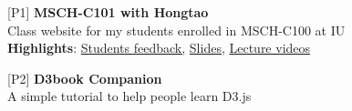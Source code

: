 

\begin{cventries}
\begin{rSection}{}
{\vspace{-0.5em}\hspace{-1.5em}[P1]\hspace{1em}\bodyfont\bfseries\color{darktext} {MSCH-C101 with Hongtao \hspace{1em} \href{https://c101.hongtaoh.com/}{\large{\faGlobe}} \hspace{1em} \href{https://github.com/hongtaoh/c101}{\Large{\faLaptop}}}}
\\\hspace{1.2em}Class website for my students enrolled in MSCH-C100 at IU
\\\hspace{1.6em} \textbf{Highlights}:\hspace{1em} \href{https://c101.hongtaoh.com/feedback/}{Students feedback,} \hspace{1em} \href{https://c101.hongtaoh.com/slides/}{Slides,} \hspace{1em} \href{https://c101.hongtaoh.com/videos/}{Lecture videos}
\vspace{-0.2em}
\end{rSection}

\begin{rSection}{}
{\hspace{-1.5em}[P2]\hspace{1em}}{\bodyfont\bfseries\color{darktext} {D3book Companion \hspace{1em} \href{https://hongtaoh.com/d3book}{\large{\faGlobe}} \hspace{1em} \href{https://github.com/hongtaoh/d3book}{\Large{\faLaptop}}}}
\\\hspace{1.2em}A simple tutorial to help people learn D3.js
\vspace{-0.2em}
\end{rSection}


\end{cventries}
